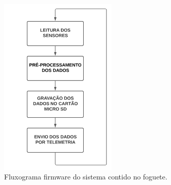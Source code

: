 


\begin{figure}[ht]
    \centering
    \caption{Fluxograma firmware do sistema contido no foguete.}
    \begin{center}
        \includegraphics[width=0.50\textwidth]{img/Fluxograma_Firmware1.png}
    \end{center}
    \vspace{-0.5cm}
    \label{fig:Fluxograma_firmware1}
\end{figure}